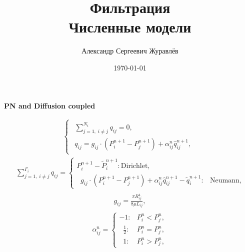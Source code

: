 \documentclass[a4paper,12pt,russian]{extreport}
\author{Александр Сергеевич Журавлёв}
\title{Фильтрация\\Численные модели}
\date{\today}
\begin{document}
    \pagecolor{pageColor}
    \color{fontColor}
    \Russian
    \printnomenclature[5em]


    \begin{center}
    {\large \textbf{PN and Diffusion coupled}}
    \end{center}

    \begin{eqnarray}
        \begin{cases}
            \begin{gathered}
                \sum^{N_{i}}_{j=1, \; i\neq j} q_{ij} = 0,   \\
                q_{ij} = g_{ij} \cdot \left(P^{n+1}_{i} - P^{n+1}_{j}\right) + \alpha^n_{ij} \hat{q}^{n+1}_{ij} ,
            \end{gathered}
        \end{cases}
    \end{eqnarray}
    \begin{eqnarray}
        \sum^{\Gamma_{i}}_{j=1, \; i\neq j} q_{ij}=\begin{cases}
                                                       P^{n+1}_{i} - \tilde{P}^{n+1}_{i}: \text{Dirichlet},\\
                                                       \; \; g_{ij} \cdot \left(P^{n+1}_{i} - P^{n+1}_{j}\right) + \alpha^n_{ij} \hat{q}^{n+1}_{ij} - \tilde{q}^{n+1}_{i}: & \text{Neumann},
        \end{cases}
    \end{eqnarray}
    \begin{eqnarray}
        \begin{gathered}
            g_{ij} = \frac{\pi R^4_{ij}}{8 \mu L_{ij}},
        \end{gathered}
    \end{eqnarray}
    \begin{eqnarray}
        \alpha^n_{ij} =\begin{cases}
                           -1: & P^{n}_{i} < P^{n}_{j},\\
                           \; \; \frac{1}{2} : & P^{n}_{i} = P^{n}_{j},\\
                           \; \; 1: & P^{n}_{i} > P^{n}_{j},
        \end{cases}
    \end{eqnarray}
\end{document}
